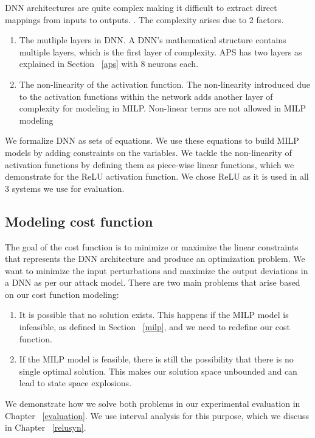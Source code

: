 DNN architectures are quite complex making it difficult to extract direct mappings from inputs to outputs. 
. 
The complexity arises due to 2 factors.
\begin{enumerate}
	\item The mutliple layers in \ac{DNN}.
    A \ac{DNN}'s  mathematical structure contains multiple layers, which is the first layer of complexity.
    \ac{APS} has two layers as explained in Section ~\ref{aps} with $8$ neurons each. 
	\item The non-linearity  of the activation function. 
The non-linearity introduced due to the activation functions within the network adds another layer of complexity for modeling in \ac{MILP}.
	Non-linear terms are not allowed in \ac{MILP} modeling \cite{gnonlinearity}
\end{enumerate}

We formalize \ac{DNN} as sets of equations.
We use these equations to build \ac{MILP} models by adding constraints on the variables. 
We tackle the non-linearity of activation functions by defining them as piece-wise linear functions, which we demonstrate for the ReLU activation function.
We chose ReLU as it is used in all 3 systems we use for evaluation. 

\subsection{Modeling cost function}
The goal of the cost function is to minimize or maximize the linear constraints that represents the \ac{DNN} architecture and produce an optimization problem. 
We want to minimize the input perturbations and maximize the output deviations in a \ac{DNN} as per our attack model. 
There are two main problems that arise based on our cost function modeling:
\begin{enumerate}
	\item It is possible that no solution exists. 
	This happens if the \ac{MILP} model is infeasible, as defined in Section ~\ref{milp}, and we need to redefine our cost function. 
	\item If the \ac{MILP} model is feasible, there is still the possibility that there is no single optimal solution. 
	This makes our solution space unbounded and can lead to state space explosions. 
\end{enumerate}

We demonstrate how we solve both problems in our experimental evaluation in Chapter ~\ref{evaluation}. 
We use interval analysis for this purpose, which we discuss in Chapter ~\ref{relusyn}. 


















